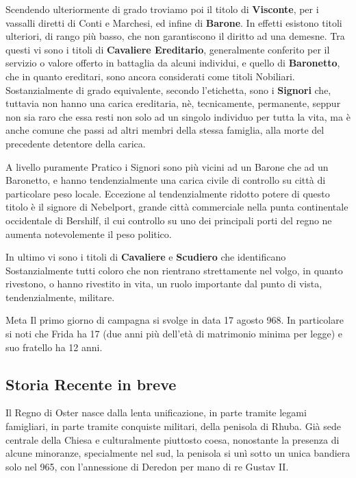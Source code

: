 Scendendo ulteriormente di grado troviamo poi il titolo di \textbf{Visconte}, per i vassalli diretti di Conti e Marchesi, ed infine di \textbf{Barone}. In effetti esistono titoli ulteriori, di rango più basso, che non garantiscono il diritto ad una demesne.
Tra questi vi sono i titoli di \textbf{Cavaliere Ereditario}, generalmente conferito per il servizio o valore offerto in battaglia da alcuni individui, e quello di \textbf{Baronetto}, che in quanto ereditari, sono ancora considerati come titoli Nobiliari. Sostanzialmente di grado equivalente, secondo l'etichetta, sono i \textbf{Signori} che, tuttavia non hanno una carica ereditaria, nè, tecnicamente, permanente, seppur non sia raro che essa resti non solo ad un singolo individuo per tutta la vita, ma è anche comune che passi ad altri membri della stessa famiglia, alla morte del precedente detentore della carica.

A livello puramente Pratico i Signori sono più vicini ad un Barone che ad un Baronetto, e hanno tendenzialmente una carica civile di controllo su città di particolare peso locale. Eccezione al tendenzialmente ridotto potere di questo titolo è il signore di Nebelport, grande città commerciale nella punta continentale occidentale di Bershilf, il cui controllo su uno dei principali porti del regno ne aumenta notevolemente il peso politico.

In ultimo vi sono i titoli di \textbf{Cavaliere} e \textbf{Scudiero} che identificano Sostanzialmente tutti coloro che non rientrano strettamente nel volgo, in quanto rivestono, o hanno rivestito in vita, un ruolo importante dal punto di vista, tendenzialmente, militare.

\begin{DndSidebar}[float=!b]{Meta}
  Il primo giorno di campagna si svolge in data 17 agosto 968. In particolare si noti che Frida ha 17 (due anni più dell'età di matrimonio minima per legge) e suo fratello ha 12 anni.
\end{DndSidebar}

\subsection{Storia Recente in breve}
Il Regno di Oster nasce dalla lenta unificazione, in parte tramite legami famigliari, in parte tramite conquiste militari, della penisola di Rhuba. Già sede centrale della Chiesa e culturalmente piuttosto coesa, nonostante la presenza di alcune minoranze, specialmente nel sud, la penisola si unì sotto un unica bandiera solo nel 965, con l'annessione di Deredon per mano di re Gustav II.

